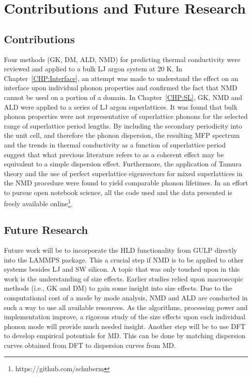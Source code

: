\chapter{Contributions and Future Research}

\section{Contributions}

Four methods (GK, DM, ALD, NMD) for predicting thermal conductivity were reviewed and applied to a bulk LJ argon system at 20 K. In Chapter~\ref{CHP:Interface}, an attempt was made to understand the effect on an interface upon individual phonon properties and confirmed the fact that NMD cannot be used on a portion of a domain. In Chapter~\ref{CHP:SL}, GK, NMD and ALD were applied to a series of LJ argon superlattices. It was found that bulk phonon properties were not representative of superlattice phonons for the selected range of superlattice period lengths. By including the secondary periodicity into the unit cell, and therefore the phonon dispersion, the resulting MFP spectrum and the trends in thermal conductivity as a function of superlattice period suggest that what previous literature refers to as a coherent effect may be equivalent to a simple dispersion effect. Furthermore, the application of Tamura theory and the use of perfect superlattice eigenvectors for mixed superlattices in the NMD procedure were found to yield comparable phonon lifetimes. In an effort to pursue open notebook science, all the code used and the data presented is freely available online\footnote{https://github.com/schuberm}.

\section{Future Research}

Future work will be to incorporate the HLD functionality from GULP directly into the LAMMPS package. This a crucial step if NMD is to be applied to other systems besides LJ and SW silicon. A topic that was only touched upon in this work is the understanding of size effects. Earlier studies relied upon macroscopic methods (i.e., GK and DM) to gain some insight into size effects. Due to the computational cost of a mode by mode analysis, NMD and ALD are conducted in such a way to use all available resources. As the algorithms, processing power and implementation improve, a rigorous study of the size effects upon each individual phonon mode will provide much needed insight. Another step will be to use DFT to develop empirical potentials for MD. This can be done by matching dispersion curves obtained from DFT to dispersion curves from MD.

